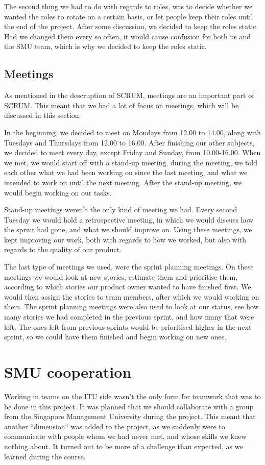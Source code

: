 The second thing we had to do with regards to roles, was to decide whether we wanted the roles to rotate on a certain basis, or let people keep their roles until the end of the project. After some discussion, we decided to keep the roles static. Had we changed them every so often, it would cause confusion for both us and the SMU team, which is why we decided to keep the roles static.

\subsection{Meetings}
\label{Collaboration_ITU_Meetings}
As mentioned in the descruption of SCRUM, meetings are an important part of SCRUM. This meant that we had a lot of focus on meetings, which will be discussed in this section.

In the beginning, we decided to meet on Mondays from 12.00 to 14.00, along with Tuesdays and Thursdays from 12.00 to 16.00. After finishing our other subjects, we decided to meet every day, except Friday and Sunday, from 10.00-16.00. When we met, we would start off with a stand-up meeting. during the meeting, we told each other what we had been working on since the last meeting, and what we intended to work on until the next meeting. After the stand-up meeting, we would begin working on our tasks.

Stand-up meetings weren't the only kind of meeting we had. Every second Tuesday we would hold a retrospective meeting, in which we would discuss how the sprint had gone, and what we should improve on. Using these meetings, we kept improving our work, both with regards to how we worked, but also with regards to the quality of our product.

The last type of meetings we used, were the sprint planning meetings. On these meetings we would look at new stories, estimate them and prioritise them, according to which stories our product owner wanted to have finished first. We would then assign the stories to team members, after which we would working on them. The sprint planning meetings were also used to look at our status, see how many stories we had completed in the previous sprint, and how many that were left. The ones left from previous sprints would be prioritised higher in the next sprint, so we could have them finished and begin working on new ones.

\section{SMU cooperation}
\label{Collaboration_SMU}
Working in teams on the ITU side wasn't the only form for teamwork that was to be done in this project. It was planned that we should collaborate with a group from the Singapore Management University during the project. This meant that another ``dimension`` was added to the project, as we suddenly were to communicate with people whom we had never met, and whose skills we knew nothing about. It turned out to be more of a challenge than expected, as we learned during the course.

